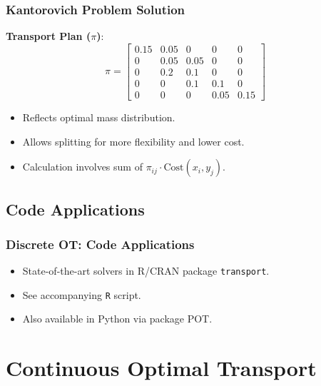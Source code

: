 \documentclass{beamer}
\begin{document}
		\begin{frame}
			\frametitle{Kantorovich Problem Solution}
			\textbf{Transport Plan (\(\pi\))}:
			\[
			\pi = \begin{bmatrix} 
				0.15 & 0.05 & 0 & 0 & 0 \\
				0 & 0.05 & 0.05 & 0 & 0 \\
				0 & 0.2 & 0.1 & 0 & 0 \\
				0 & 0 & 0.1 & 0.1 & 0 \\
				0 & 0 & 0 & 0.05 & 0.15 
			\end{bmatrix}
			\]
			\begin{itemize}
				\item Reflects optimal mass distribution.
				\item Allows splitting for more flexibility and lower cost.
				\item Calculation involves sum of \(\pi_{ij} \cdot \text{Cost}(x_i, y_j)\).
			\end{itemize}
		\end{frame}
	
	\subsection{Code Applications}
	\begin{frame}
		\frametitle{Discrete OT: Code Applications}
		\begin{itemize}
			\item State-of-the-art solvers in R/CRAN package \texttt{transport}.
			\item See accompanying \texttt{R} script.
			\item Also available in Python via package POT.
		\end{itemize}
	\end{frame}
	
	\section{Continuous Optimal Transport}
	
\end{document}
